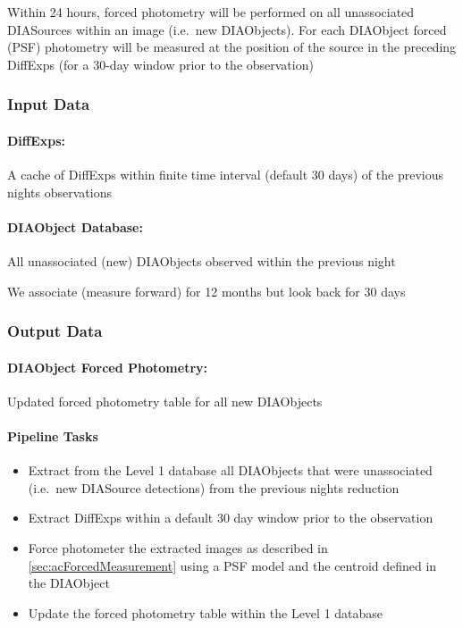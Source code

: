 Within 24 hours, forced photometry will be performed on all unassociated DIASources within an image (i.e.\ new DIAObjects). For each DIAObject forced (PSF) photometry will be measured at the position of the source in the preceding DiffExps (for a 30-day window prior to the observation)

\subsubsection{Input Data}

\paragraph*{DiffExps:} A cache of DiffExps within finite time interval (default 30 days)  of the previous nights observations

\paragraph*{DIAObject Database:} All unassociated (new) DIAObjects observed within the previous night

\begin{note} We associate (measure forward) for 12 months but look back for 30 days\end{note}

\subsubsection{Output Data}

\paragraph*{DIAObject Forced Photometry:} Updated forced photometry table for all new DIAObjects


\paragraph{Pipeline Tasks}

\begin{itemize}
\item Extract from the Level 1 database all DIAObjects that were unassociated (i.e.\ new DIASource detections) from the previous nights reduction
\item Extract DiffExps within a  default 30 day window prior to the observation
\item Force photometer the extracted images as described in \ref{sec:acForcedMeasurement} using a PSF model and the centroid defined in the DIAObject
\item Update the forced photometry table within the Level 1 database
\end{itemize}
\clearpage



